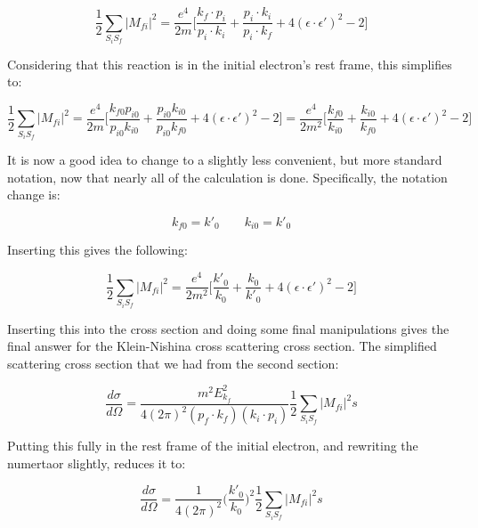\documentclass[a4]{article}
\begin{document}
    \begin{equation}
        \frac{1}{2} \sum_{S_i S_f} |M_{fi}|^2 = \frac{e^4}{2m} \Bigg[ \frac{k_f \cdot p_i}{p_i \cdot k_i}
        + \frac{p_i \cdot k_i}{p_i \cdot k_f} + 4 (\epsilon \cdot \epsilon')^2 - 2 \Bigg] 
    \end{equation}

    Considering that this reaction is in the initial electron's rest frame, this simplifies to:

    \begin{equation}
        \frac{1}{2} \sum_{S_i S_f} |M_{fi}|^2 = \frac{e^4}{2m} \Bigg[ \frac{k_{f0} p_{i0}}{p_{i0} k_{i0}}
        + \frac{p_{i0} k_{i0}}{p_{i0} k_{f0}} + 4 (\epsilon \cdot \epsilon')^2 - 2 \Bigg] = \frac{e^4}{2m^2} \Bigg[ \frac{k_{f0}}{k_{i0}}
        + \frac{k_{i0}}{k_{f0}} + 4 (\epsilon \cdot \epsilon')^2 - 2 \Bigg]
    \end{equation}

    It is now a good idea to change to a slightly less convenient, but more standard notation, now that nearly all of the calculation is done. Specifically, the notation change is:
    
    \begin{equation}
        k_{f0} = k'_{0} \qquad  k_{i0} = k'_{0}
    \end{equation}

    Inserting this gives the following:

    \begin{equation}
        \frac{1}{2} \sum_{S_i S_f} |M_{fi}|^2 = \frac{e^4}{2m^2} \Bigg[ \frac{k'_{0}}{k_{0}}
        + \frac{k_{0}}{k'_{0}} + 4 (\epsilon \cdot \epsilon')^2 - 2 \Bigg]
    \end{equation}

    Inserting this into the cross section and doing some final manipulations gives the final answer for the Klein-Nishina cross scattering cross section. 
    The simplified scattering cross section that we had from the second section:

    \begin{equation}
        \frac{d \sigma}{d \Omega} = \frac{m^2 E^2_{k_f}}{4 (2 \pi)^2 (p_f \cdot k_f) (k_i \cdot p_i) } \frac{1}{2} \sum_{S_i S_f} |M_{fi}|^2s
    \end{equation}

    Putting this fully in the rest frame of the initial electron, and rewriting the numertaor slightly, reduces it to:

    \begin{equation}
        \frac{d \sigma}{d \Omega} = \frac{1}{4 (2 \pi)^2} \bigg( \frac{k'_0}{k_0} \bigg)^2 \frac{1}{2} \sum_{S_i S_f} |M_{fi}|^2s
    \end{equation}
\end{document}
